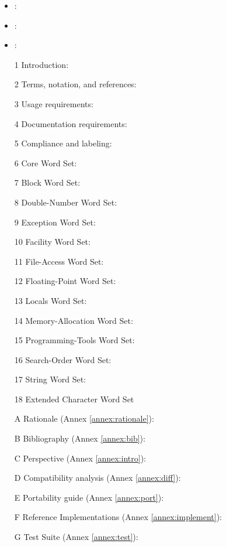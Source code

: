  
	\begin{itemize}
	\item {}:							%
	\item {}:							%
	\item {}:							%
	\item[1] Introduction:							%
	\item[2] Terms, notation, and references:	%
	\item[3] Usage requirements:					%
	\item[4] Documentation requirements:		%
	\item[5] Compliance and labeling:			%
	\item[6] Core Word Set:							%
	\item[7] Block Word Set:						%
	\item[8] Double-Number Word Set:				%
	\item[9] Exception Word Set:					%
	\item[10] Facility Word Set:					%
	\item[11] File-Access Word Set:				%
	\item[12] Floating-Point Word Set:			%
	\item[13] Locals Word Set:						%
	\item[14] Memory-Allocation Word Set:		%
	\item[15] Programming-Tools Word Set:		%
	\item[16] Search-Order Word Set:				%
	\item[17] String Word Set:						%
	\item[18] Extended Character Word Set		%
	\item[A] Rationale (Annex \ref{annex:rationale}):				%
	\item[B] Bibliography (Annex \ref{annex:bib}):					%
	\item[C] Perspective (Annex \ref{annex:intro}):					%
	\item[D] Compatibility analysis (Annex \ref{annex:diff}):	%
	\item[E] Portability guide (Annex \ref{annex:port}):			%
	\item[F] Reference Implementations (Annex \ref{annex:implement}):	%
	\item[G] Test Suite (Annex \ref{annex:test}):					%
	\end{itemize}

\endinput

\version{ToDo}{}{\empty}
	\begin{itemize}
	\item Develop new Globalisation word set
	\item Develop extended Memory Access word set
	\end{itemize}

